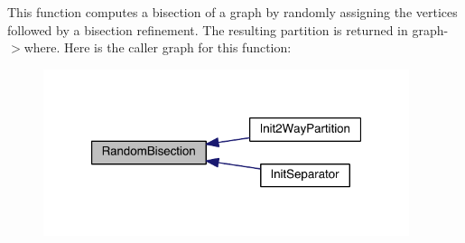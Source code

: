This function computes a bisection of a graph by randomly assigning the vertices followed by a bisection refinement. The resulting partition is returned in graph-\/$>$where. Here is the caller graph for this function\+:\nopagebreak
\begin{figure}[H]
\begin{center}
\leavevmode
\includegraphics[width=304pt]{a00903_ad9f0573a18d3fcfa45d73c3bef80e5f8_icgraph}
\end{center}
\end{figure}
